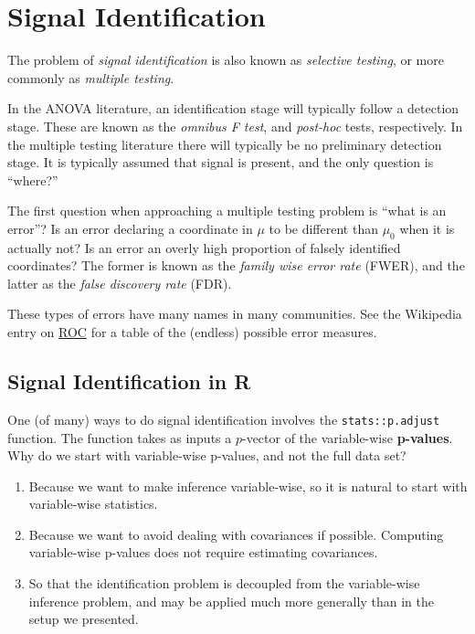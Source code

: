 \documentclass[]{book}
\providecommand{\tightlist}{%
  \setlength{\itemsep}{0pt}\setlength{\parskip}{0pt}}
\theoremstyle{definition}
\theoremstyle{definition}
\theoremstyle{definition}
\theoremstyle{remark}
\let\BeginKnitrBlock\begin \let\EndKnitrBlock\end
\begin{document}
\section{Signal Identification}\label{identification}

The problem of \emph{signal identification} is also known as
\emph{selective testing}, or more commonly as \emph{multiple testing}.

In the ANOVA literature, an identification stage will typically follow a
detection stage. These are known as the \emph{omnibus F test}, and
\emph{post-hoc} tests, respectively. In the multiple testing literature
there will typically be no preliminary detection stage. It is typically
assumed that signal is present, and the only question is ``where?''

The first question when approaching a multiple testing problem is ``what
is an error''? Is an error declaring a coordinate in \(\mu\) to be
different than \(\mu_0\) when it is actually not? Is an error an overly
high proportion of falsely identified coordinates? The former is known
as the \emph{family wise error rate} (FWER), and the latter as the
\emph{false discovery rate} (FDR).

\BeginKnitrBlock{remark}
{}These types of errors have many names in many
communities. See the Wikipedia entry on
\href{https://en.wikipedia.org/wiki/Receiver_operating_characteristic}{ROC}
for a table of the (endless) possible error measures.
\EndKnitrBlock{remark}

\subsection{Signal Identification in
R}\label{signal-identification-in-r}

One (of many) ways to do signal identification involves the
\texttt{stats::p.adjust} function. The function takes as inputs a
\(p\)-vector of the variable-wise \textbf{p-values}. Why do we start
with variable-wise p-values, and not the full data set?

\begin{enumerate}
\def\labelenumi{\alph{enumi}.}
\tightlist
\item
  Because we want to make inference variable-wise, so it is natural to
  start with variable-wise statistics.
\item
  Because we want to avoid dealing with covariances if possible.
  Computing variable-wise p-values does not require estimating
  covariances.
\item
  So that the identification problem is decoupled from the variable-wise
  inference problem, and may be applied much more generally than in the
  setup we presented.
\end{enumerate}
\end{document}
